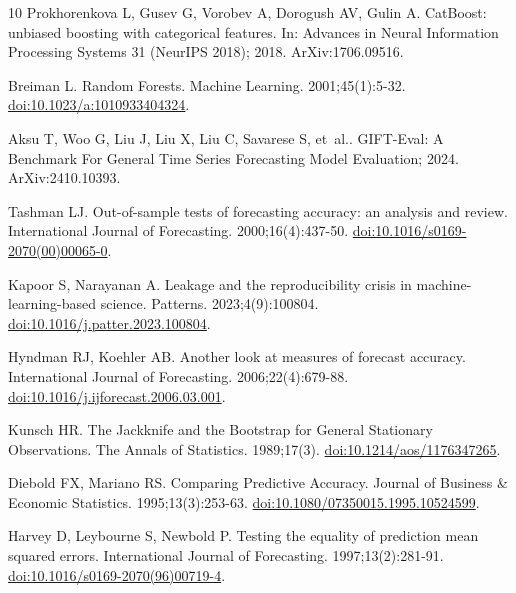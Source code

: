 \documentclass[10pt,letterpaper]{article}
\begin{document}
\begin{thebibliography}{10}
Prokhorenkova L, Gusev G, Vorobev A, Dorogush AV, Gulin A.
\newblock CatBoost: unbiased boosting with categorical features.
\newblock In: Advances in Neural Information Processing Systems 31 (NeurIPS
  2018); 2018. ArXiv:1706.09516.

Breiman L.
\newblock Random Forests.
\newblock Machine Learning. 2001;45(1):5-32.
\newblock \href {http://dx.doi.org/10.1023/a:1010933404324}
  {doi:10.1023/a:1010933404324}.

Aksu T, Woo G, Liu J, Liu X, Liu C, Savarese S, et~al.. {GIFT-Eval}: A
  Benchmark For General Time Series Forecasting Model Evaluation; 2024.
\newblock ArXiv:2410.10393.

Tashman LJ.
\newblock Out-of-sample tests of forecasting accuracy: an analysis and review.
\newblock International Journal of Forecasting. 2000;16(4):437-50.
\newblock \href {http://dx.doi.org/10.1016/s0169-2070(00)00065-0}
  {doi:10.1016/s0169-2070(00)00065-0}.

Kapoor S, Narayanan A.
\newblock Leakage and the reproducibility crisis in machine-learning-based
  science.
\newblock Patterns. 2023;4(9):100804.
\newblock \href {http://dx.doi.org/10.1016/j.patter.2023.100804}
  {doi:10.1016/j.patter.2023.100804}.

Hyndman RJ, Koehler AB.
\newblock Another look at measures of forecast accuracy.
\newblock International Journal of Forecasting. 2006;22(4):679-88.
\newblock \href {http://dx.doi.org/10.1016/j.ijforecast.2006.03.001}
  {doi:10.1016/j.ijforecast.2006.03.001}.

Kunsch HR.
\newblock The Jackknife and the Bootstrap for General Stationary Observations.
\newblock The Annals of Statistics. 1989;17(3).
\newblock \href {http://dx.doi.org/10.1214/aos/1176347265}
  {doi:10.1214/aos/1176347265}.

Diebold FX, Mariano RS.
\newblock Comparing Predictive Accuracy.
\newblock Journal of Business \& Economic Statistics. 1995;13(3):253-63.
\newblock \href {http://dx.doi.org/10.1080/07350015.1995.10524599}
  {doi:10.1080/07350015.1995.10524599}.

Harvey D, Leybourne S, Newbold P.
\newblock Testing the equality of prediction mean squared errors.
\newblock International Journal of Forecasting. 1997;13(2):281-91.
\newblock \href {http://dx.doi.org/10.1016/s0169-2070(96)00719-4}
  {doi:10.1016/s0169-2070(96)00719-4}.


\end{thebibliography}
\end{document}
